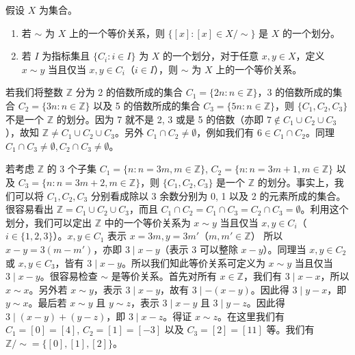 \begin{theorem}
假设 $X$ 为集合。
\begin{enumerate}
    \item 若 $\sim$ 为 $X$ 上的一个等价关系，则 $\{[x] : [x] \in X/ \sim\}$ 是 $X$ 的一个划分。
    \item 若 $I$ 为指标集且 $\{C_i : i \in I\}$ 为 $X$ 的一个划分，对于任意 $x, y \in X$，定义 $x \sim y$ 当且仅当 $x, y \in C_i$（$i \in I$），则 $\sim$ 为 $X$ 上的一个等价关系。
\end{enumerate}
\end{theorem}

\begin{example}
若我们将整数 $\mathbb{Z}$ 分为 2 的倍数所成的集合 $C_1 = \{2n : n \in \mathbb{Z}\}$，3 的倍数所成的集合 $C_2 = \{3n : n \in \mathbb{Z}\}$ 以及 5 的倍数所成的集合 $C_3 = \{5n : n \in \mathbb{Z}\}$，则 $\{C_1, C_2, C_3\}$ 不是一个 $\mathbb{Z}$ 的划分。因为 7 就不是 2, 3 或是 5 的倍数（亦即 $7 \notin C_1 \cup C_2 \cup C_3$），故知 $\mathbb{Z} \neq C_1 \cup C_2 \cup C_3$。另外 $C_1 \cap C_2 \neq \emptyset$，例如我们有 $6 \in C_1 \cap C_2$。同理 $C_1 \cap C_3 \neq \emptyset, C_2 \cap C_3 \neq \emptyset$。

若考虑 $\mathbb{Z}$ 的 3 个子集 $C_1 = \{n : n = 3m, m \in \mathbb{Z}\}$, $C_2 = \{n : n = 3m + 1, m \in \mathbb{Z}\}$ 以及 $C_3 = \{n : n = 3m + 2, m \in \mathbb{Z}\}$，则 $\{C_1, C_2, C_3\}$ 是一个 $\mathbb{Z}$ 的划分。事实上，我们可以将 $C_1, C_2, C_3$ 分别看成除以 3 余数分别为 0, 1 以及 2 的元素所成的集合。很容易看出 $\mathbb{Z} = C_1 \cup C_2 \cup C_3$，而且 $C_1 \cap C_2 = C_1 \cap C_3 = C_2 \cap C_3 = \emptyset$。利用这个划分，我们可以定出 $\mathbb{Z}$ 中的一个等价关系为 $x \sim y$ 当且仅当 $x, y \in C_i$（$i \in \{1, 2, 3\}$）。$x, y \in C_1$ 表示 $x = 3m, y = 3m'$（$m, m' \in \mathbb{Z}$） 所以 $x - y = 3(m - m')$，亦即 $3 \mid x - y$（表示 3 可以整除 $x - y$）。同理当 $x, y \in C_2$ 或 $x, y \in C_3$，皆有 $3 \mid x - y$。所以我们知此等价关系可定义为 $x \sim y$ 当且仅当 $3 \mid x - y$。很容易检查 $\sim$ 是等价关系。首先对所有 $x \in \mathbb{Z}$，我们有 $3 \mid x - x$，所以 $x \sim x$。另外若 $x \sim y$，表示 $3 \mid x - y$，故有 $3 \mid -(x - y)$。因此得 $3 \mid y - x$，即 $y \sim x$。最后若 $x \sim y$ 且 $y \sim z$，表示 $3 \mid x - y$ 且 $3 \mid y - z$。因此得 $3 \mid (x - y) + (y - z)$，即 $3 \mid x - z$。得证 $x \sim z$。在这里我们有 $C_1 = [0] = [4]$, $C_2 = [1] = [-3]$ 以及 $C_3 = [2] = [11]$ 等。我们有 $\mathbb{Z}/ \sim = \{[0], [1], [2]\}$。
\end{example}

